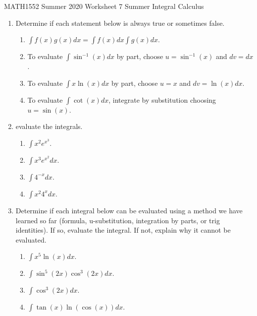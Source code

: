 \documentclass[12pt]{article}
\begin{document}
\noindent
MATH1552 Summer 2020
\hspace{2.2cm}
Worksheet 7 Summer
\hspace{2cm} Integral Calculus

\vspace{2mm}


\begin{enumerate}

\item Determine if each statement below is always true or sometimes false.


\begin{enumerate}
\item $\int f(x)g(x)dx=\int f(x)dx\int g(x)dx$.

\item To evaluate $\int \sin^{-1}(x)dx$ by part, choose $u= \sin^{-1}(x)$ and $dv=dx$.

\item To evaluate $\int x\ln(x)dx$ by part, choose $u= x$ and $dv=\ln(x)dx$.

\item  To evaluate $\int \cot(x)dx$, integrate by substitution choosing $u= \sin(x)$. 

\end{enumerate}

\item evaluate the integrals.

\begin{enumerate}
\item $\int x^2 e^{x^3}$.


\item $\int x^3 e^{x^2}dx$.

\item  $\int 4^{-x}dx$.

\item $\int x^2 4^xdx$.

\end{enumerate}

\item Determine if each integral below can be evaluated using a method we have learned so
far (formula, u-substitution, integration by parts, or trig identities). If so, evaluate the
integral. If not, explain why it cannot be evaluated.

\begin{enumerate}

\item $\int x^5\ln(x)dx$.


\item $\int \sin^5(2x)\cos^3(2x)dx$.

\item $\int \cos^3(2x)dx$.

\item $\int \tan(x)\ln(\cos(x))dx$.

\end{enumerate}



\end{enumerate}
\end{document}
